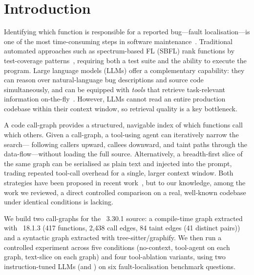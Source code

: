 \section{Introduction}
\label{sec:intro}

Identifying which function is responsible for a reported bug---fault
localisation---is one of the most time-consuming steps in software
maintenance~\cite{wong16survey}.
Traditional automated approaches such as spectrum-based FL (SBFL) rank
functions by test-coverage patterns~\cite{jones05tarantula}, requiring both a
test suite and the ability to execute the program.
Large language models (LLMs) offer a complementary capability: they can reason
over natural-language bug descriptions and source code simultaneously, and can
be equipped with \emph{tools} that retrieve task-relevant information
on-the-fly~\cite{yao23react}.
However, LLMs cannot read an entire production codebase within their context
window, so retrieval quality is a key bottleneck.

A code call-graph provides a structured, navigable index of which functions
call which others.
Given a call-graph, a tool-using agent can iteratively narrow the search---
following callers upward, callees downward, and taint paths through the
data-flow---without loading the full source.
Alternatively, a breadth-first slice of the same graph can be serialised as
plain text and injected into the prompt, trading repeated tool-call overhead
for a single, larger context window.
Both strategies have been proposed in recent work~\cite{yildiz25jitvul,li26onesize},
but to our knowledge, among the work we reviewed, a direct controlled comparison on a real,
well-known codebase under identical conditions is lacking.

We build two call-graphs for the \sqlite~3.30.1 source: a compile-time graph
extracted with \clang~18.1.3 (417 functions, 2{,}438 call edges, 84 taint
edges (41 distinct pairs)) and a syntactic graph extracted with tree-sitter/graphify.
We then run a controlled experiment across five conditions (no-context,
tool-agent on each graph, text-slice on each graph) and four tool-ablation
variants, using two instruction-tuned LLMs (\qwen and \nemotron) on six
fault-localisation benchmark questions.

